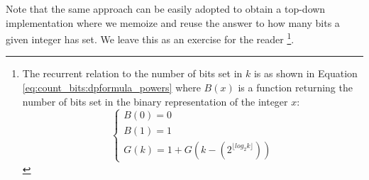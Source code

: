 Note that the same approach can be easily adopted to obtain a top-down implementation where we memoize and reuse the answer to how many bits a given integer has set.
We leave this  as an exercise for the reader \footnote{The recurrent relation to the number of bits set in $k$ is as shown in Equation \ref{eq:count_bits:dpformula_powers} where $B(x)$ is a function returning the number of bits set in the binary representation of the integer $x$:
\begin{equation}
	\begin{cases}
		B(0) = 0 \\
		B(1) = 1 \\
		G(k) =  1 + G(k-(2^{\lfloor log_2{k \rfloor}})) 	 \end{cases}
	\label{eq:count_bits:dpformula_powers}
\end{equation}
}.